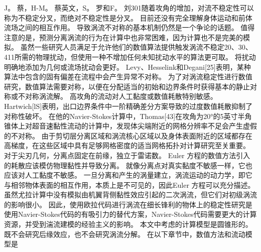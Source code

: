 \documentclass[UTF8,11pt,a4paper,openany,fontset=fandol]{ctexbook}
\begin{document}
J。 蔡，H-M。 蔡英文，S。 罗和F。 刘301随着攻角的增加，对流不稳定性可以称为不稳定分叉，而绝对不稳定性是分叉。 目前还没有完全理解身体运动和前体流场之间的相互作用。 导致涡流不对称的基本机制仍然是一个争论的话题。 值得注意的是，预测分离涡流的行为在计算中也非常困难，因为计算也不是完美的模拟。 虽然一些研究人员满足于允许他们的数值算法提供触发涡流不稳定20、30、411所需的物理扰动，但使用一种不增加任何未知扰动水平的算法更可取。 将扰动明确地添加为几何或流场扰动会更好。 Levy、Hesselink和Degani[25]表明，某种算法中包含的固有偏差在流程中会产生异常不对称。 为了对涡流稳定性进行数值研究，数值算法需要对称，以便在分配适当的初始和边界条件时获得基本的静止对称或不对称涡流解。 高攻角的流动对人工黏度或数值耗散特别敏感。 Hartwich[lS]表明，出口边界条件中一阶精确差分方案导致的过度数值耗散抑制了对称性破坏。 在他的Navier-Stokes计算中，Thomas[43]在攻角为20°的5英寸半角锥体上对超音速黏性流动的计算中，发现体尖端附近的网格分辨率不足会产生虚假的不对称。 由于剪切层分离区域和涡流核心区域以及身体表面附近的区域都存在高梯度，在这些区域中具有足够网格密度的适当网格拓扑对计算研究至关重要。 对于尖刃几何，分离点固定在前缘，独立于雷诺数。 Euler 方程的数值方法引入的耗散应该模仿物理黏性并导致分离。 就像分离点对真实黏度不敏感一样，它也应该对人工黏度不敏感。 一旦分离和产生的涡量建立，涡流运动的动力学，即它与相邻物体表面的相互作用，本质上是不可见的，因此Euler 方程可以充分描述。 虽然尤拉计算中没有模拟由机翼背侧黏性效应引起的二次涡流，但它们对初级涡流的影响很小。 因此，使用欧拉代码进行涡流在细长锋利的物体上的稳定性研究是使用Navier-Stokes代码的有吸引力的替代方案，Navier-Stokes代码需要更大的计算资源，并受到湍流建模的经验主义的影响。 本文中考虑的计算模型是圆锥形的。 既不会研究后缘效应，也不会研究涡流分解。 在以下章节中，数值方法和流动模型是
\end{document}
